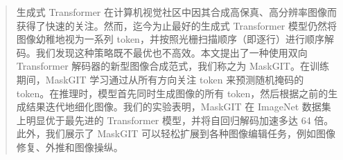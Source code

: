 
\begin{abstract}

生成式 Transformer 在计算机视觉社区中因其合成高保真、高分辨率图像而获得了快速的关注。然而，迄今为止最好的生成式 Transformer 模型仍然将图像幼稚地视为一系列 token，并按照光栅扫描顺序（即逐行）进行顺序解码。我们发现这种策略既不最优也不高效。本文提出了一种使用双向 Transformer 解码器的新型图像合成范式，我们称之为 MaskGIT。在训练期间，MaskGIT 学习通过从所有方向关注 token 来预测随机掩码的 token。在推理时，模型首先同时生成图像的所有 token，然后根据之前的生成结果迭代地细化图像。我们的实验表明，MaskGIT 在 ImageNet 数据集上明显优于最先进的 Transformer 模型，并将自回归解码加速多达 64 倍。此外，我们展示了 MaskGIT 可以轻松扩展到各种图像编辑任务，例如图像修复、外推和图像操纵。


\end{abstract}

\vspace{-6mm}

